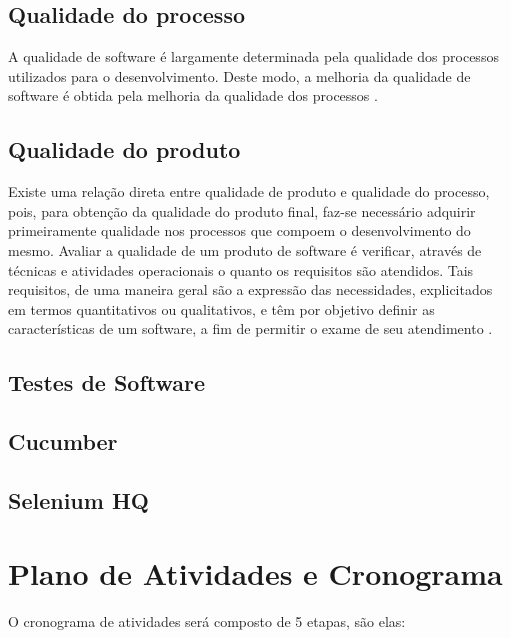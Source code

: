 \documentclass[12pt]{article}
\begin{document}
	
	\subsection{Qualidade do processo}
	
	A qualidade de software é largamente determinada pela qualidade dos processos utilizados para o desenvolvimento. Deste modo, a melhoria 
	da qualidade de software é obtida pela melhoria da qualidade dos processos \cite{koscianski2007qualidade}. 
	
	\subsection{Qualidade do produto}

	Existe uma relação direta entre qualidade de produto e qualidade do processo, pois, para obtenção da qualidade do produto final,
	faz-se necessário adquirir primeiramente qualidade nos processos que compoem o desenvolvimento do mesmo.
	Avaliar a qualidade de um produto de software é verificar, através de técnicas e atividades operacionais o quanto os requisitos são atendidos. Tais requisitos,
	de uma maneira geral são a expressão das necessidades, explicitados em termos quantitativos ou qualitativos, e têm por objetivo definir as características de
	um software, a fim de permitir o exame de seu atendimento \cite{koscianski2007qualidade}.
	
	\subsection{Testes de Software}
	
	\subsection{Cucumber}

	\subsection{Selenium HQ}
	
	\section{Plano de Atividades e Cronograma}

	O cronograma de atividades será composto de 5 etapas, são elas:
	
\end{document}
